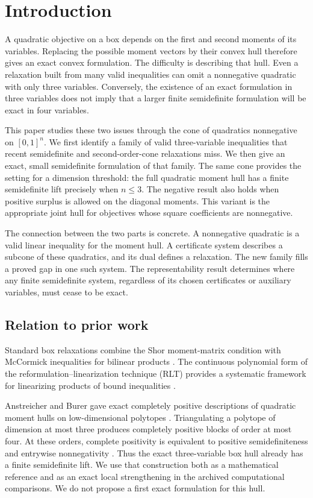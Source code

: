 \section{Introduction}\label{sec:introduction}

A quadratic objective on a box depends on the first and second moments of
its variables. Replacing the possible moment vectors by their convex hull
therefore gives an exact convex formulation. The difficulty is describing
that hull. Even a relaxation built from many valid inequalities can omit a
nonnegative quadratic with only three variables. Conversely, the existence
of an exact formulation in three variables does not imply that a larger
finite semidefinite formulation will be exact in four variables.

This paper studies these two issues through the cone of quadratics
nonnegative on $[0,1]^n$. We first identify a family of valid three-variable
inequalities that recent semidefinite and second-order-cone relaxations
miss. We then give an exact, small semidefinite formulation of that family.
The same cone provides the setting for a dimension threshold: the full
quadratic moment hull has a finite semidefinite lift precisely when
$n\le3$. The negative result also holds when positive surplus is allowed
on the diagonal moments. This variant is the appropriate joint hull for
objectives whose square coefficients are nonnegative.

The connection between the two parts is concrete. A nonnegative quadratic
is a valid linear inequality for the moment hull. A certificate system
describes a subcone of these quadratics, and its dual defines a relaxation.
The new family fills a proved gap in one such system. The representability
result determines where any finite semidefinite system, regardless of its
chosen certificates or auxiliary variables, must cease to be exact.

\subsection{Relation to prior work}

Standard box relaxations combine the Shor moment-matrix condition
\citep{Shor1987QuadraticOptimization} with McCormick inequalities for
bilinear products \citep{McCormick1976}. The continuous polynomial form
of the reformulation--linearization technique (RLT) provides a systematic
framework for linearizing products of bound inequalities
\citep{SheraliTuncbilek1992}.

Anstreicher and Burer gave exact completely positive descriptions of
quadratic moment hulls on low-dimensional polytopes
\citep{AnstreicherBurer2010}. Triangulating a polytope of dimension at most
three produces completely positive blocks of order at most four. At these
orders, complete positivity is equivalent to positive semidefiniteness
and entrywise nonnegativity \citep{Diananda1962,MaxfieldMinc1962}.
Thus the exact three-variable box hull already has a finite semidefinite
lift. We use that construction both as a mathematical reference and as an
exact local strengthening in the archived computational comparisons. We do
not propose a first exact formulation for this hull.

